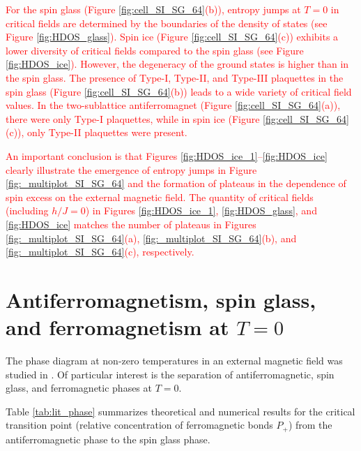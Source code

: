 \documentclass[preprint,12pt]{elsarticle}
\begin{document}
	\textcolor{red}{For the spin glass (Figure \ref{fig:cell_SI_SG_64}(b)), entropy jumps at $T = 0$ in critical fields are determined by the boundaries of the density of states (see Figure \ref{fig:HDOS_glass}).
	Spin ice (Figure \ref{fig:cell_SI_SG_64}(c)) exhibits a lower diversity of critical fields compared to the spin glass (see Figure \ref{fig:HDOS_ice}). However, the degeneracy of the ground states is higher than in the spin glass.
	The presence of Type-I, Type-II, and Type-III plaquettes in the spin glass (Figure \ref{fig:cell_SI_SG_64}(b)) leads to a wide variety of critical field values. In the two-sublattice antiferromagnet (Figure \ref{fig:cell_SI_SG_64}(a)), there were only Type-I plaquettes, while in spin ice (Figure \ref{fig:cell_SI_SG_64}(c)), only Type-II plaquettes were present.}
	
	\textcolor{red}{An important conclusion is that Figures \ref{fig:HDOS_ice_1}–\ref{fig:HDOS_ice} clearly illustrate the emergence of entropy jumps in Figure \ref{fig:_multiplot_SI_SG_64} and the formation of plateaus in the dependence of spin excess on the external magnetic field.  
	The quantity of critical fields (including $h/J=0$) in Figures \ref{fig:HDOS_ice_1}, \ref{fig:HDOS_glass}, and \ref{fig:HDOS_ice} matches the number of plateaus in Figures \ref{fig:_multiplot_SI_SG_64}(a), \ref{fig:_multiplot_SI_SG_64}(b), and \ref{fig:_multiplot_SI_SG_64}(c), respectively.}
	
	
	\section{Antiferromagnetism, spin glass, and ferromagnetism at $T = 0$}
	
	The phase diagram at non-zero temperatures in an external magnetic field was studied in \cite{trukhin2024thermodynamic}. Of particular interest is the separation of antiferromagnetic, spin glass, and ferromagnetic phases at $T = 0$.
	
	Table \ref{tab:lit_phase} summarizes theoretical and numerical results for the critical transition point (relative concentration of ferromagnetic bonds $P_+$) from the antiferromagnetic phase to the spin glass phase.
	
\end{document}
